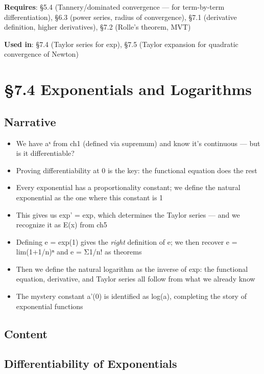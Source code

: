 \documentclass[
  10pt,
  letterpaper,
]{scrbook}
\providecommand{\tightlist}{%
  \setlength{\itemsep}{0pt}\setlength{\parskip}{0pt}}
\begin{document}
\textbf{Requires}: §5.4 (Tannery/dominated convergence --- for
term-by-term differentiation), §6.3 (power series, radius of
convergence), §7.1 (derivative definition, higher derivatives), §7.2
(Rolle's theorem, MVT)

\textbf{Used in}: §7.4 (Taylor series for exp), §7.5 (Taylor expansion
for quadratic convergence of Newton)

\section{§7.4 Exponentials and
Logarithms}\label{exponentials-and-logarithms}

\subsection{Narrative}\label{narrative-32}

\begin{itemize}
\tightlist
\item
  We have aˣ from ch1 (defined via supremum) and know it's continuous
  --- but is it differentiable?
\item
  Proving differentiability at 0 is the key: the functional equation
  does the rest
\item
  Every exponential has a proportionality constant; we define the
  natural exponential as the one where this constant is 1
\item
  This gives us exp' = exp, which determines the Taylor series --- and
  we recognize it as E(x) from ch5
\item
  Defining e = exp(1) gives the \emph{right} definition of e; we then
  recover e = lim(1+1/n)ⁿ and e = Σ1/n! as theorems
\item
  Then we define the natural logarithm as the inverse of exp: the
  functional equation, derivative, and Taylor series all follow from
  what we already know
\item
  The mystery constant a'(0) is identified as log(a), completing the
  story of exponential functions
\end{itemize}

\subsection{Content}\label{content-32}

\subsection{Differentiability of
Exponentials}\label{differentiability-of-exponentials}
\end{document}
